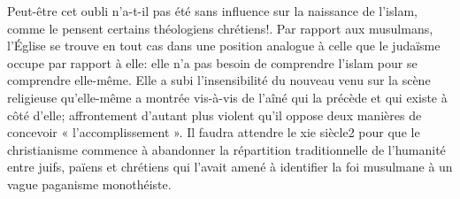 Peut-être cet oubli n'a-t-il pas été sans influence sur la naissance de l'islam, comme le pensent certains théologiens chrétiens!. Par rapport aux musulmans, l'Église se trouve en tout cas dans une position analogue à celle que le judaïsme occupe par rapport à elle: elle n'a pas besoin de comprendre l'islam pour se comprendre elle-même. Elle a subi l'insensibilité du nouveau venu sur la scène religieuse qu'elle-même a montrée vis-à-vis de l'aîné qui la précède et qui existe à côté d'elle; affrontement d'autant plus violent qu'il oppose deux manières de concevoir « l'accomplissement ». Il faudra attendre le xie siècle2 pour que le christianisme commence à abandonner la répartition traditionnelle de l'humanité entre juifs, païens et chrétiens qui l'avait amené à identifier la foi musulmane à un vague paganisme monothéiste.

